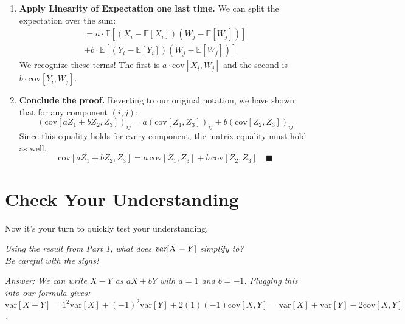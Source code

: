 \documentclass[11pt,a4paper]{article}
\begin{document}
\begin{enumerate}
    \item \textbf{Apply Linearity of Expectation one last time.}
    We can split the expectation over the sum:
    \begin{align*}
        = a \cdot \mathbb{E}[(X_i - \mathbb{E}[X_i])(W_j - \mathbb{E}[W_j])] \\
        + b \cdot \mathbb{E}[(Y_i - \mathbb{E}[Y_i])(W_j - \mathbb{E}[W_j])]
    \end{align*}
    We recognize these terms! The first is $a \cdot \text{cov}[X_i, W_j]$ and the second is $b \cdot \text{cov}[Y_i, W_j]$.

    \item \textbf{Conclude the proof.}
    Reverting to our original notation, we have shown that for any component $(i,j)$:
    \[
        (\text{cov}[aZ_1 + bZ_2, Z_3])_{ij} = a(\text{cov}[Z_1, Z_3])_{ij} + b(\text{cov}[Z_2, Z_3])_{ij}
    \]
    Since this equality holds for every component, the matrix equality must hold as well.
    \[
        \text{cov}[aZ_1 + bZ_2, Z_3] = a\,\text{cov}[Z_1, Z_3] + b\,\text{cov}[Z_2, Z_3] \quad \blacksquare
    \]
\end{enumerate}

\section{Check Your Understanding}
Now it's your turn to quickly test your understanding.
\begin{center}
\textit{Using the result from Part 1, what does $\emph{var}[X - Y]$ simplify to? \\ Be careful with the signs!}
\end{center}
\vspace{1cm}
\textit{Answer: We can write $X-Y$ as $aX+bY$ with $a=1$ and $b=-1$. Plugging this into our formula gives:
$\text{var}[X-Y] = 1^2\text{var}[X] + (-1)^2\text{var}[Y] + 2(1)(-1)\text{cov}[X,Y] = \text{var}[X] + \text{var}[Y] - 2\text{cov}[X,Y]$.}
\end{document}
